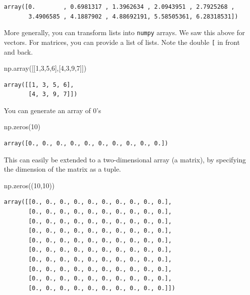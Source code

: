 \documentclass[
  letterpaper,
]{scrbook}
\newenvironment{Shaded}{\begin{snugshade}}{\end{snugshade}}
\newcommand{\DecValTok}[1]{\textcolor[rgb]{0.00,0.00,0.81}{#1}}
\newcommand{\NormalTok}[1]{#1}
\begin{document}
\begin{verbatim}
array([0.        , 0.6981317 , 1.3962634 , 2.0943951 , 2.7925268 ,
       3.4906585 , 4.1887902 , 4.88692191, 5.58505361, 6.28318531])
\end{verbatim}

More generally, you can transform lists into \texttt{numpy} arrays. We saw this above for vectors. For matrices, you can provide a list of lists. Note the double \texttt{{[}} in front and back.

\begin{Shaded}
\begin{Highlighting}[]
\NormalTok{np.array([[}\DecValTok{1}\NormalTok{,}\DecValTok{3}\NormalTok{,}\DecValTok{5}\NormalTok{,}\DecValTok{6}\NormalTok{],[}\DecValTok{4}\NormalTok{,}\DecValTok{3}\NormalTok{,}\DecValTok{9}\NormalTok{,}\DecValTok{7}\NormalTok{]])}
\end{Highlighting}
\end{Shaded}

\begin{verbatim}
array([[1, 3, 5, 6],
       [4, 3, 9, 7]])
\end{verbatim}

You can generate an array of 0's

\begin{Shaded}
\begin{Highlighting}[]
\NormalTok{np.zeros(}\DecValTok{10}\NormalTok{)}
\end{Highlighting}
\end{Shaded}

\begin{verbatim}
array([0., 0., 0., 0., 0., 0., 0., 0., 0., 0.])
\end{verbatim}

This can easily be extended to a two-dimensional array (a matrix), by specifying the dimension of the matrix as a tuple.

\begin{Shaded}
\begin{Highlighting}[]
\NormalTok{np.zeros((}\DecValTok{10}\NormalTok{,}\DecValTok{10}\NormalTok{))}
\end{Highlighting}
\end{Shaded}

\begin{verbatim}
array([[0., 0., 0., 0., 0., 0., 0., 0., 0., 0.],
       [0., 0., 0., 0., 0., 0., 0., 0., 0., 0.],
       [0., 0., 0., 0., 0., 0., 0., 0., 0., 0.],
       [0., 0., 0., 0., 0., 0., 0., 0., 0., 0.],
       [0., 0., 0., 0., 0., 0., 0., 0., 0., 0.],
       [0., 0., 0., 0., 0., 0., 0., 0., 0., 0.],
       [0., 0., 0., 0., 0., 0., 0., 0., 0., 0.],
       [0., 0., 0., 0., 0., 0., 0., 0., 0., 0.],
       [0., 0., 0., 0., 0., 0., 0., 0., 0., 0.],
       [0., 0., 0., 0., 0., 0., 0., 0., 0., 0.]])
\end{verbatim}
\end{document}
